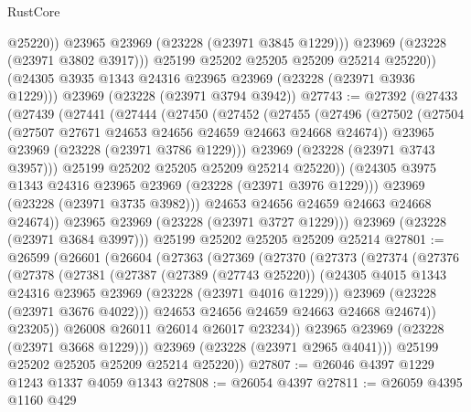 \begin{lexlean}{RustCore}
\begin{coremodule}
                @25220))
            @23965
            @23969
            (@23228 (@23971 @3845 @1229)))
          @23969
          (@23228 (@23971 @3802 @3917)))
        @25199
        @25202
        @25205
        @25209
        @25214
        @25220))
    (@24305 @3935 @1343 @24316 @23965 @23969 (@23228 (@23971 @3936 @1229)))
    @23969
    (@23228 (@23971 @3794 @3942))
@27743 := @27392
    (@27433
      (@27439
        (@27441
          (@27444
            (@27450
              (@27452
                (@27455
                  (@27496
                    (@27502
                      (@27504 (@27507 @27671 @24653 @24656 @24659 @24663 @24668 @24674))
                      @23965
                      @23969
                      (@23228 (@23971 @3786 @1229)))
                    @23969
                    (@23228 (@23971 @3743 @3957)))
                  @25199
                  @25202
                  @25205
                  @25209
                  @25214
                  @25220))
              (@24305 @3975 @1343 @24316 @23965 @23969 (@23228 (@23971 @3976 @1229)))
              @23969
              (@23228 (@23971 @3735 @3982)))
            @24653
            @24656
            @24659
            @24663
            @24668
            @24674))
        @23965
        @23969
        (@23228 (@23971 @3727 @1229)))
      @23969
      (@23228 (@23971 @3684 @3997)))
    @25199
    @25202
    @25205
    @25209
    @25214
@27801 := @26599
    (@26601
      (@26604
        (@27363
          (@27369
            (@27370
              (@27373
                (@27374
                  (@27376
                    (@27378
                      (@27381
                        (@27387
                          (@27389 (@27743 @25220))
                          (@24305 @4015 @1343 @24316 @23965 @23969 (@23228 (@23971 @4016 @1229)))
                          @23969
                          (@23228 (@23971 @3676 @4022)))
                        @24653
                        @24656
                        @24659
                        @24663
                        @24668
                        @24674))
                    @23205))
                @26008
                @26011
                @26014
                @26017
                @23234))
            @23965
            @23969
            (@23228 (@23971 @3668 @1229)))
          @23969
          (@23228 (@23971 @2965 @4041)))
        @25199
        @25202
        @25205
        @25209
        @25214
        @25220))
@27807 := @26046 @4397 @1229 @1243 @1337 @4059 @1343
@27808 := @26054 @4397
@27811 := @26059 @4395 @1160 @429

\end{coremodule}
\end{lexlean}
